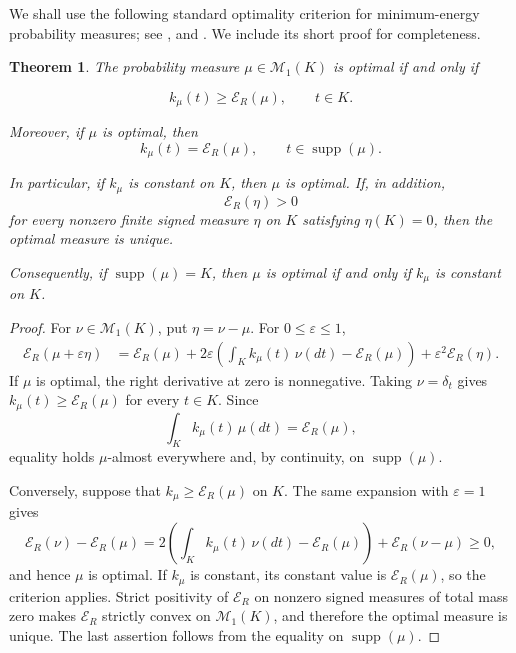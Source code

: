 \documentclass[10pt,a4paper]{amsart}
\newtheorem{theorem}{Theorem}[section]
\providecommand{\supp}{\operatorname{supp}}
\newcommand{\cM}{\mathcal M_1}
\begin{document}
We shall use the following standard optimality criterion for minimum-energy
probability measures; see   \cite[Theorem~4.3]{adler2014existence}, \cite[Theorem~2.1]{selk2024large} and
\cite[Theorem~1.1]{pronzato2021minimum}.  We include its short proof for
completeness.


\begin{theorem}
\label{thm:optimal-measure-criterion} The probability measure
\(\mu\in\cM(K)\) is optimal
if and only if

\[
        k_\mu(t)\ge \mathcal E_R(\mu),
        \qquad t\in K.
\]

Moreover, if \(\mu\) is optimal, then
\[
        k_\mu(t)=\mathcal E_R(\mu),
        \qquad t\in\supp(\mu).
\]

In particular, if \(k_\mu\) is constant on \(K\), then \(\mu\) is
optimal. If, in addition,
\[
        \mathcal E_R(\eta)>0
\]
for every nonzero finite signed measure \(\eta\) on \(K\) satisfying
\(\eta(K)=0\), then the optimal measure is unique.

Consequently, if \(\supp(\mu)=K\), then \(\mu\) is optimal if and only if
\(k_\mu\) is constant on \(K\).
\end{theorem}

\begin{proof}
For \(\nu\in\cM(K)\), put \(\eta=\nu-\mu\).  For
\(0\leq\varepsilon\leq1\),
\begin{align*}
 \mathcal E_R(\mu+\varepsilon\eta)
 &=\mathcal E_R(\mu)
   +2\varepsilon\left(\int_Kk_\mu(t)\,\nu(dt)
                         -\mathcal E_R(\mu)\right)
   +\varepsilon^2\mathcal E_R(\eta).
\end{align*}
If \(\mu\) is optimal, the right derivative at zero is nonnegative.
Taking \(\nu=\delta_t\) gives
\(k_\mu(t)\geq\mathcal E_R(\mu)\) for every \(t\in K\).  Since
\[
 \int_Kk_\mu(t)\,\mu(dt)=\mathcal E_R(\mu),
\]
equality holds \(\mu\)-almost everywhere and, by continuity, on
\(\supp(\mu)\).

Conversely, suppose that
\(k_\mu\geq\mathcal E_R(\mu)\) on \(K\).  The same expansion with
\(\varepsilon=1\) gives
\[
 \mathcal E_R(\nu)-\mathcal E_R(\mu)
 =2\left(\int_Kk_\mu(t)\,\nu(dt)-\mathcal E_R(\mu)\right)
   +\mathcal E_R(\nu-\mu)\geq0,
\]
and hence \(\mu\) is optimal.  If \(k_\mu\) is constant, its constant
value is \(\mathcal E_R(\mu)\), so the criterion applies.  Strict positivity
of \(\mathcal E_R\) on nonzero signed measures of total mass zero makes
\(\mathcal E_R\) strictly convex on \(\cM(K)\), and therefore the
optimal measure is unique.  The last assertion follows from the equality
on \(\supp(\mu)\).
\end{proof}
\end{document}

